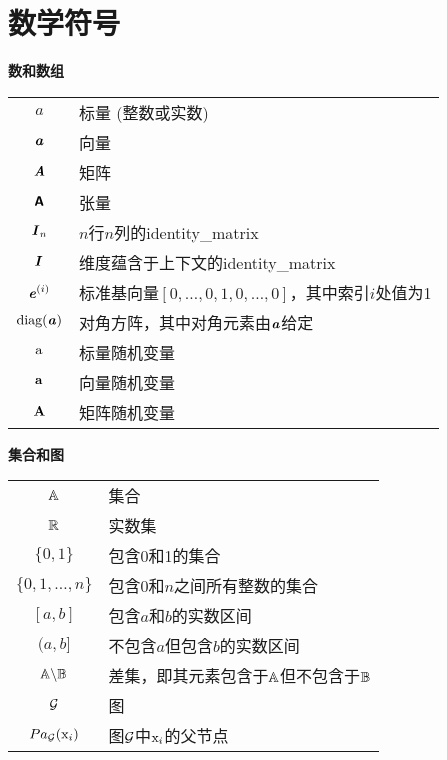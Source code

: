 \chapter*{数学符号}
\label{notation}


\vspace{\notationgap}
\begin{minipage}{\textwidth}
\centerline{\bf 数和数组}
\bgroup
\def\arraystretch{1.5}
\begin{tabular}{cp{3.25in}}
$\displaystyle a$ & 标量 (整数或实数) \\
$\displaystyle \boldsymbol{\mathit{a}}$ & 向量 \\
$\displaystyle \boldsymbol{\mathit{A}}$ & 矩阵 \\
$\displaystyle \textsf{\textbf{A}}$ & 张量 \\
$\displaystyle \boldsymbol{\mathit{I}}_n$ & $n$行$n$列的\gls{identity_matrix} \\
    $\displaystyle \boldsymbol{\mathit{I}}$ &  维度蕴含于上下文的\gls{identity_matrix} \\
$\displaystyle \boldsymbol{\mathit{e}}^{(i)}$ & 标准基向量$[0,\dots,0,1,0,\dots,0]$，其中索引$i$处值为1 \\ 
$\displaystyle \text{diag}(\boldsymbol{\mathit{a}})$ & 对角方阵，其中对角元素由$\boldsymbol{\mathit{a}}$给定 \\
$\displaystyle \mathrm{a}$ & 标量随机变量 \\
$\displaystyle \mathbf{a}$ & 向量随机变量 \\
$\displaystyle \boldsymbol{\mathrm{A}}$ & 矩阵随机变量 \\
\end{tabular}
\egroup
\end{minipage}

\vspace{\notationgap}
\begin{minipage}{\textwidth}
\centerline{\bf 集合和图}
\bgroup
\def\arraystretch{1.5}
\begin{tabular}{cp{3.25in}}
$\displaystyle \mathbb{A}$ & 集合 \\
$\displaystyle \mathbb{R}$ & 实数集 \\
$\displaystyle \{0, 1\}$ & 包含0和1的集合 \\
$\displaystyle \{0, 1, \dots, n \}$ & 包含$0$和$n$之间所有整数的集合 \\
$\displaystyle [a, b]$ & 包含$a$和$b$的实数区间 \\
$\displaystyle (a, b]$ & 不包含$a$但包含$b$的实数区间 \\
$\displaystyle \mathbb{A} \backslash \mathbb{B}$ & 差集，即其元素包含于$\mathbb{A}$但不包含于$\mathbb{B}$\\
$\displaystyle \mathcal{G}$ & 图 \\
$\displaystyle Pa_{\mathcal{G}}(\mathrm{x}_i)$ & 图$\mathcal{G}$中$\mathrm{x}_i$的父节点
\end{tabular}
\egroup
\end{minipage}

